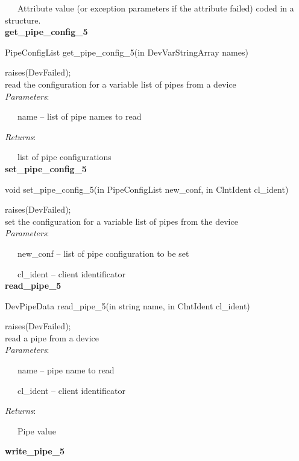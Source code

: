 ~~~Attribute value (or exception parameters if the attribute failed)
coded in a structure.\\


\textbf{get\_pipe\_config\_5}

PipeConfigList get\_pipe\_config\_5(in DevVarStringArray names)

raises(DevFailed);\\


read the configuration for a variable list of pipes from a device\\


\emph{Parameters}:

~~~name -- list of pipe names to read

\emph{Returns}:

~~~list of pipe configurations\\


\textbf{set\_pipe\_config\_5}

void set\_pipe\_config\_5(in PipeConfigList new\_conf, in ClntIdent
cl\_ident)

raises(DevFailed);\\


set the configuration for a variable list of pipes from the device\\


\emph{Parameters}:

~~~new\_conf -- list of pipe configuration to be set

~~~cl\_ident -- client identificator\textbf{}\\


\textbf{read\_pipe\_5}

DevPipeData read\_pipe\_5(in string name, in ClntIdent cl\_ident)

raises(DevFailed);\\


read a pipe from a device\\


\emph{Parameters}:

~~~name -- pipe name to read

~~~cl\_ident -- client identificator

\emph{Returns}:

~~~Pipe value\\


\begin{flushleft}
\textbf{write\_pipe\_5}
\par\end{flushleft}

